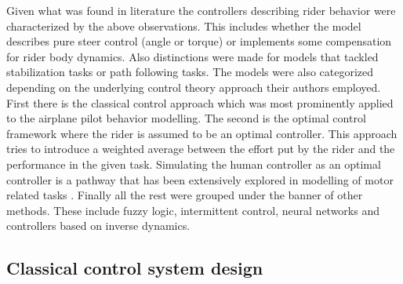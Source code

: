 Given what was found in literature the controllers describing rider behavior were characterized by the above observations. This includes whether the model describes pure steer control (angle or torque) or implements some compensation for rider body dynamics. Also distinctions were made for models that tackled stabilization tasks or path following tasks. The models were also categorized depending on the underlying control theory  approach their authors employed. First there is the classical control approach which was most prominently applied to the airplane pilot behavior modelling. The second is the optimal control framework where the rider is assumed to be an optimal controller. This approach tries to introduce a weighted average between the effort put by the rider and the performance in the given task. Simulating the human controller as an optimal controller is a pathway that has been extensively explored in modelling of motor related tasks \cite{baron1984adaptive}. Finally all the rest were grouped under the banner of other methods. These include fuzzy logic, intermittent control, neural networks and controllers based on inverse dynamics.
\subsection{Classical control system design} \label{ch:classical}

